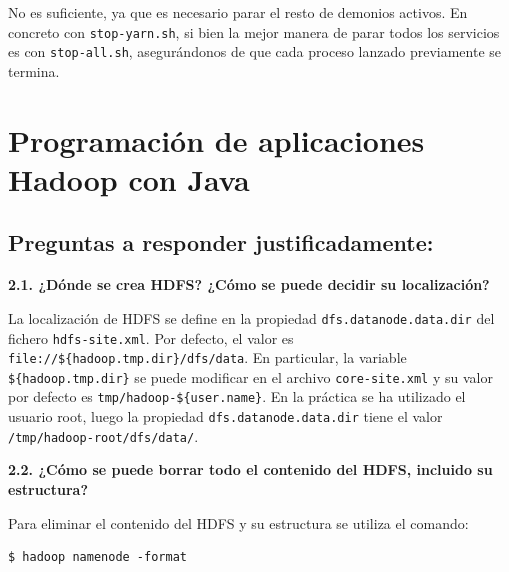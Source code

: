 \documentclass[10pt,swedish, openany]{book}
\begin{document}
No es suficiente, ya que es necesario parar el resto de demonios activos. En concreto con \texttt{stop-yarn.sh}, si bien la mejor manera de parar todos los servicios es con \texttt{stop-all.sh}, asegurándonos de que cada proceso lanzado previamente se termina.



\section{Programación de aplicaciones Hadoop con Java}
\subsection*{Preguntas a responder justificadamente:}

\textbf{2.1. ¿Dónde se crea HDFS? ¿Cómo se puede decidir su localización?}

La localización de HDFS se define en la propiedad \texttt{dfs.datanode.data.dir} del fichero \texttt{hdfs-site.xml}. Por defecto, el valor es \texttt{file://\$\{hadoop.tmp.dir\}/dfs/data}. En particular, la variable \texttt{\$\{hadoop.tmp.dir\}} se puede modificar en el archivo \texttt{core-site.xml} y su valor por defecto es \texttt{tmp/hadoop-\$\{user.name\}}. En la práctica se ha utilizado el usuario root, luego la propiedad \texttt{dfs.datanode.data.dir} tiene el valor \\ \texttt{/tmp/hadoop-root/dfs/data/}.
\vspace{0.8em}

\textbf{2.2. ¿Cómo se puede borrar todo el contenido del HDFS, incluido su estructura?}

Para eliminar el contenido del HDFS y su estructura se utiliza el comando:

\begin{lstlisting}
$ hadoop namenode -format
\end{lstlisting}

\vspace{0.8em}
\end{document}
